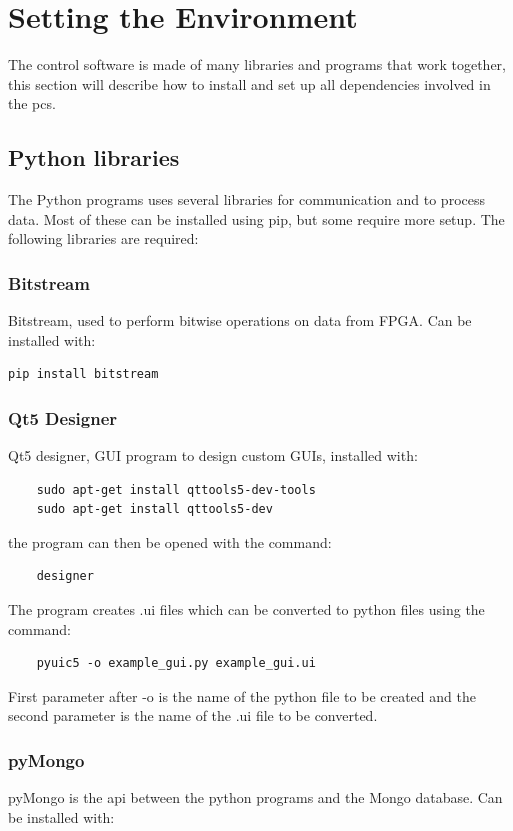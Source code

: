 \documentclass[main.tex]{subfiles}
\begin{document}
\section{Setting the Environment}

The control software is made of many libraries and programs that work together, this section will describe how to install and set up all dependencies involved in the \gls{pcs}.

\subsection{Python libraries}

The Python programs uses several libraries for communication and to process data. Most of these can be installed using pip, but some require more setup. The following libraries are required:
\subsubsection{Bitstream}
Bitstream, used to perform bitwise operations on data from FPGA. Can be installed with:
\begin{verbatim}
pip install bitstream    
\end{verbatim}

\subsubsection{Qt5 Designer}
Qt5 designer, GUI program to design custom GUIs, installed with:

\begin{verbatim}
    sudo apt-get install qttools5-dev-tools
    sudo apt-get install qttools5-dev
\end{verbatim}
the program can then be opened with the command:
\begin{verbatim}
    designer
\end{verbatim}

The program creates .ui files which can be converted to python files using the command:

\begin{verbatim}
    pyuic5 -o example_gui.py example_gui.ui
\end{verbatim}

First parameter after -o is the name of the python file to be created and the second parameter is the name of the .ui file to be converted.

\subsubsection{pyMongo}
pyMongo is the \gls{api} between the python programs and the Mongo database. Can be installed with:
\end{document}
